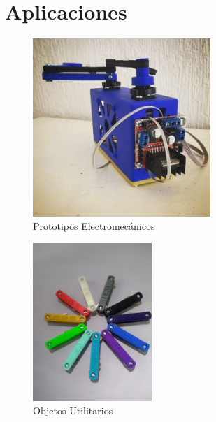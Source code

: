 \documentclass{beamer}
\begin{document}

\section{Aplicaciones}


\begin{frame}
      \begin{figure}[h!]
   	\centering
   	\includegraphics[width=0.6\textwidth]{BrazoAzul1}
   	\caption{Prototipos Electromecánicos}
   	\label{brazo}
   \end{figure}
\end{frame}


\begin{frame}
\begin{figure}[h!]
	\centering
	\includegraphics[width=0.4\textwidth]{portallaves}
	\caption{Objetos Utilitarios}
	\label{portallaves}
\end{figure}
\end{frame}

\end{document}
